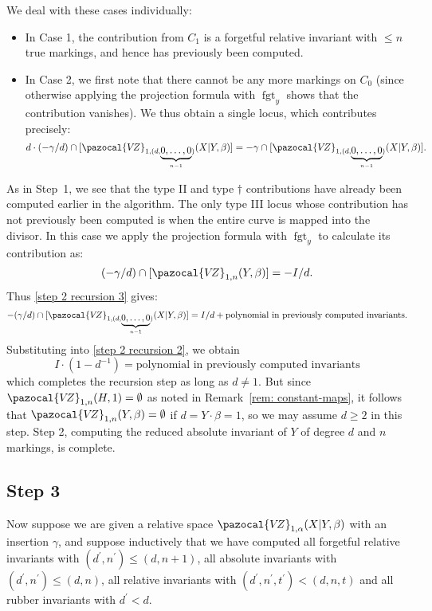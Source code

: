 \documentclass[11pt]{amsart}
\newcommand{\VZ}{\pazocal{V\!Z}}
\newcommand{\fgt}{\operatorname{fgt}}
\theoremstyle{definition}
\theoremstyle{definition}
\begin{document}
We deal with these cases individually:
\begin{itemize}
\item In Case 1, the contribution from $C_1$ is a forgetful relative invariant with $\leq n$ true markings, and hence has previously been computed. 
\item In Case 2, we first note that there cannot be any more markings on $C_0$ (since otherwise applying the projection formula with $\fgt_y$ shows that the contribution vanishes). We thus obtain a single locus, which contributes precisely:
\begin{equation*} d\cdot(-\gamma/d) \cap [\VZ_{1,(d,\underbrace{0,\ldots,0}_{n-1})}(X|Y,\beta)] = -\gamma\cap[\VZ_{1,(d,\underbrace{0,\ldots,0}_{n-1})}(X|Y,\beta)].\end{equation*}
\end{itemize}
As in Step~1, we see that the type II and type $\dag$ contributions have already been computed earlier in the algorithm. The only type III locus whose contribution has not previously been computed is when the entire curve is mapped into the divisor. In this case we apply the projection formula with $\fgt_y$ to calculate its contribution as:
\begin{equation*} (-\gamma/d) \cap [\VZ_{1,n}(Y,\beta)] = -I/d.\end{equation*}
Thus \eqref{step 2 recursion 3} gives:
\begin{equation*} -(\gamma/d) \cap [\VZ_{1,(d,\underbrace{0,\ldots,0}_{n-1})}(X|Y,\beta)] = I/d + \text{polynomial in previously computed invariants}.\end{equation*}
Substituting into \eqref{step 2 recursion 2}, we obtain
\begin{equation*} I\cdot(1-d^{-1}) = \text{polynomial in previously computed invariants} \end{equation*}
which completes the recursion step as long as $d \neq 1$. But since $\VZ_{1,n}(H,1)=\emptyset$ as noted in Remark~\ref{rem: constant-maps}, it follows that $\VZ_{1,n}(Y,\beta)=\emptyset$ if $d=Y\cdot\beta=1$, so we may assume $d \geq 2$ in this step. Step 2, computing the reduced absolute invariant of $Y$ of degree $d$ and $n$ markings, is complete.

\subsection*{Step 3} Now suppose we are given a relative space $\VZ_{1,\alpha}(X|Y,\beta)$ with an insertion $\gamma$, and suppose inductively that we have computed all forgetful relative invariants with $(d^\prime,n^\prime) \leq (d,n+1)$, all absolute invariants with $(d^\prime,n^\prime) \leq (d,n)$, all relative invariants with $(d^\prime,n^\prime,t^\prime)<(d,n,t)$ and all rubber invariants with $d^\prime < d$.
\end{document}
